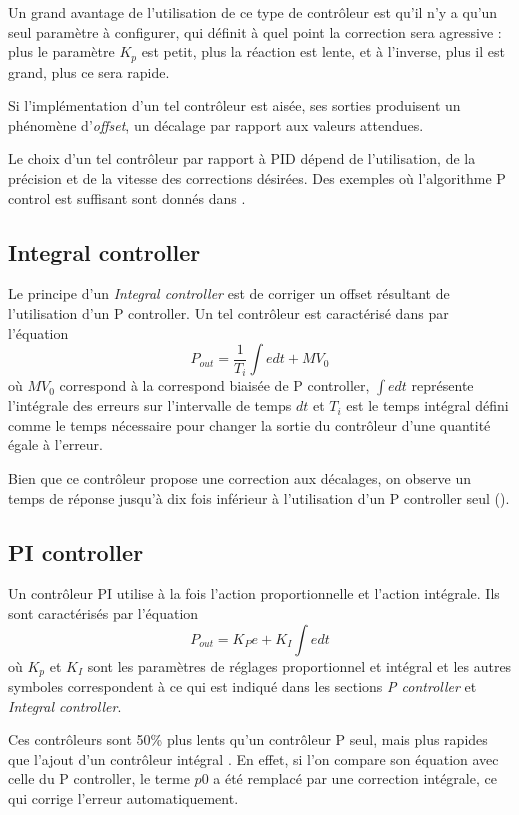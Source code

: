 Un grand avantage de l'utilisation de ce type de contrôleur est qu'il n'y a qu'un seul paramètre à configurer, qui définit à quel point la correction sera agressive : plus le paramètre $K_{p}$ est petit, plus la réaction est lente, et à l'inverse, plus il est grand, plus ce sera rapide.

Si l'implémentation d'un tel contrôleur est aisée, ses sorties produisent un phénomène d'\emph{offset}, un décalage par rapport aux valeurs attendues.

Le choix d'un tel contrôleur par rapport à PID dépend de l'utilisation, de la précision et de la vitesse des corrections désirées.
Des exemples où l'algorithme P control est suffisant sont donnés dans \cite{sellers2001overview}.

\subsection{Integral controller}
Le principe d'un \emph{Integral controller} est de corriger un offset résultant de l'utilisation d'un P controller.
Un tel contrôleur est caractérisé dans \cite{svrcek2006real} par l'équation
\begin{equation}P_{out} = \frac{1}{T_{i}}\int e dt + MV_{0}\end{equation}
où $MV_{0}$ correspond à la correspond biaisée de P controller,
$\int e dt$ représente l'intégrale des erreurs sur l'intervalle de temps $dt$ et $T_{i}$ est le temps intégral défini comme le temps nécessaire pour changer la sortie du contrôleur d'une quantité égale à l'erreur.

Bien que ce contrôleur propose une correction aux décalages, on observe un temps de réponse jusqu'à dix fois inférieur à l'utilisation d'un P controller seul (\cite{svrcek2006real}).

\subsection{PI controller}
Un contrôleur PI utilise à la fois l'action proportionnelle et l'action intégrale.
Ils sont caractérisés par l'équation
\begin{equation}P_{out} = K_{P} e + K_{I} \int e dt\end{equation}
où $K_{p}$ et $K_{I}$ sont les paramètres de réglages proportionnel et intégral
et les autres symboles correspondent à ce qui est indiqué dans les sections \emph{P controller} et \emph{Integral controller}.

Ces contrôleurs sont 50\% plus lents qu'un contrôleur P seul, mais plus rapides que l'ajout d'un contrôleur intégral \cite{svrcek2006real}.
En effet, si l'on compare son équation avec celle du P controller, le terme $p0$ a été remplacé par une correction intégrale, ce qui corrige l'erreur automatiquement.

